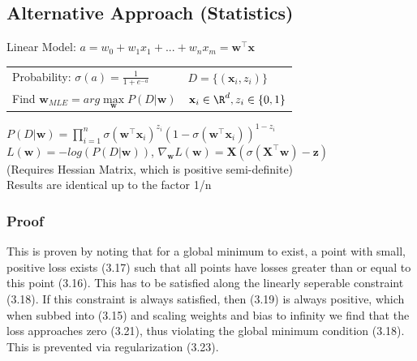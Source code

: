 \documentclass[english]{latex4ei/latex4ei_sheet}
\begin{document}
\begin{sectionbox}
\subsection{Alternative Approach (Statistics)}
Linear Model: $a = w_0+w_1x_1+...+w_nx_m = \mathbf{w}^{\top}\mathbf{x}$\\
\begin{tabular}{ll}
    Probability: $\sigma(a)=\frac{1}{1+e^{-a}}$ & $D=\{(\mathbf{x}_i,z_i)\}$\\
    Find $\mathbf{w}_{MLE}=arg \max\limits_{\mathbf{w}} P(D|\mathbf{w})$ &  $\mathbf{x}_i\in \R^d, z_i\in\{0,1\}$\\
\end{tabular}
$P(D|\mathbf{w})=\prod\limits_{i=1}^n\sigma(\mathbf{w}^{\top}\mathbf{x}_i)^{z_i}(1-\sigma(\mathbf{w}^{\top}\mathbf{x}_i))^{1-z_i}$\\
$L(\mathbf{w})=-log(P(D|\mathbf{w}))$, $\nabla_{\mathbf{w}}L(\mathbf{w})=\mathbf{X}(\sigma(\mathbf{X}^{\top}\mathbf{w})-\mathbf{z})$\\
(Requires Hessian Matrix, which is positive semi-definite)\\
Results are identical up to the factor 1/n
\\
\subsubsection{Proof}
This is proven by noting that for a global minimum to exist, a point with small, positive loss exists (3.17) such that all points have losses greater than or equal to this point (3.16). This has to be satisfied along the linearly seperable constraint (3.18). If this constraint is always satisfied, then (3.19) is always positive, which when subbed into (3.15) and scaling weights and bias to infinity we find that the loss approaches zero (3.21), thus violating the global minimum condition (3.18). This is prevented via regularization (3.23).
\end{sectionbox}
\end{document}
